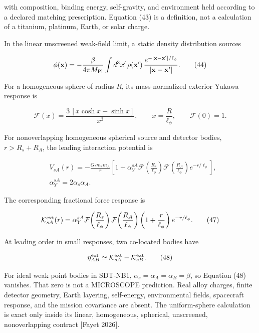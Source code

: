 \documentclass[
  american,
  11pt,
  letterpaper,
]{article}
\begin{document}
with composition, binding energy, self-gravity, and environment held according to a declared matching prescription. Equation (43) is a definition, not a calculation of a titanium, platinum, Earth, or solar charge.

In the linear unscreened weak-field limit, a static density distribution sources

\begin{equation}
\phi(\mathbf x)
=-\frac{\beta}{4\pi M_{\rm Pl}}
\int d^3x'\,\rho(\mathbf x')\,
\frac{e^{-|\mathbf x-\mathbf x'|/\ell_\phi}}
{|\mathbf x-\mathbf x'|}.
\tag{44}
\end{equation}

For a homogeneous sphere of radius \(R\), its mass-normalized exterior Yukawa response is

\begin{equation}
\mathcal F(x)
=\frac{3\,[x\cosh x-\sinh x]}{x^3},
\qquad x=\frac{R}{\ell_\phi},
\qquad \mathcal F(0)=1.
\tag{45}
\end{equation}

For nonoverlapping homogeneous spherical source and detector bodies, \(r>R_s+R_A\), the leading interaction potential is

\begin{equation}
\begin{aligned}
& V_{sA}(r)
=-\frac{G_*m_sm_A}{r}
\left[
1+\alpha_Y^{sA}
\mathcal F\!\left(\frac{R_s}{\ell_\phi}\right)
\mathcal F\!\left(\frac{R_A}{\ell_\phi}\right)
e^{-r/\ell_\phi}
\right], \\
& \alpha_Y^{sA}=2\alpha_s\alpha_A.
\end{aligned}
\tag{46}
\end{equation}

The corresponding fractional force response is

\begin{equation}
\mathcal K_{sA}^{\rm ext}(r)
=\alpha_Y^{sA}
\mathcal F\!\left(\frac{R_s}{\ell_\phi}\right)
\mathcal F\!\left(\frac{R_A}{\ell_\phi}\right)
\left(1+\frac{r}{\ell_\phi}\right)e^{-r/\ell_\phi}.
\tag{47}
\end{equation}

At leading order in small responses, two co-located bodies have

\begin{equation}
\eta_{AB}^{\rm ext}
\simeq
\mathcal K_{sA}^{\rm ext}-\mathcal K_{sB}^{\rm ext}.
\tag{48}
\end{equation}

For ideal weak point bodies in SDT-NB1, \(\alpha_s=\alpha_A=\alpha_B=\beta\), so Equation (48) vanishes. That zero is not a MICROSCOPE prediction. Real alloy charges, finite detector geometry, Earth layering, self-energy, environmental fields, spacecraft response, and the mission covariance are absent. The uniform-sphere calculation is exact only inside its linear, homogeneous, spherical, unscreened, nonoverlapping contract {[}Fayet 2026{]}.
\end{document}
